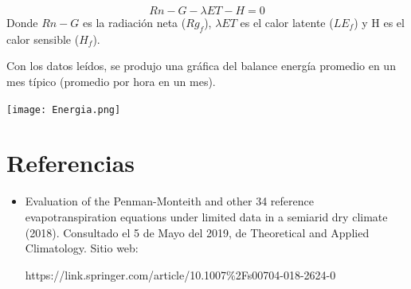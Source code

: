 \documentclass{article}
\begin{document}
\begin{equation}
    Rn - G - \lambda ET  - H  = 0
\end{equation}
Donde $Rn-G$ es la radiación neta ($Rg_f$), $\lambda ET$  es el calor latente ($LE_f$) y H es el calor sensible ($H_f$).

Con los datos leídos, se produjo una gráfica del balance energía promedio en un mes típico (promedio por hora en un mes).

\begin{center}
    \texttt{[image: Energia.png]}
\end{center}

\section{Referencias}

\begin{itemize}
    \item Evaluation of the Penman-Monteith and other 34 reference evapotranspiration equations under limited data in a semiarid dry climate (2018). Consultado el 5 de Mayo del 2019, de Theoretical and Applied Climatology. Sitio web: 
    
    https://link.springer.com/article/10.1007\%2Fs00704-018-2624-0
\end{itemize}
\end{document}
